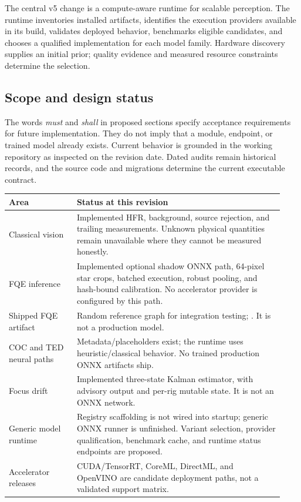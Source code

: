 \documentclass[11pt,a4paper]{article}
\newcommand{\code}[1]{\texttt{\detokenize{#1}}}
\begin{document}
The central v5 change is a compute-aware runtime for scalable perception.
The runtime inventories installed artifacts, identifies the execution providers
available in its build, validates deployed behavior, benchmarks eligible
candidates, and chooses a qualified implementation for each model family.
Hardware discovery supplies an initial prior; quality evidence and measured
resource constraints determine the selection.

\subsection{Scope and design status}
The words \emph{must} and \emph{shall} in proposed sections specify acceptance
requirements for future implementation. They do not imply that a module,
endpoint, or trained model already exists. Current behavior is grounded in the
working repository as inspected on the revision date. Dated audits remain
historical records, and the source code and migrations determine the current
executable contract.

\begin{longtable}{@{}L{0.23\linewidth}L{0.70\linewidth}@{}}
\toprule Area & Status at this revision\\\midrule\endhead
Classical vision & Implemented HFR, background, source rejection, and trailing
measurements. Unknown physical quantities remain unavailable where they cannot
be measured honestly.\\
FQE inference & Implemented optional shadow ONNX path, 64-pixel star crops,
batched execution, robust pooling, and hash-bound calibration. No accelerator
provider is configured by this path.\\
Shipped FQE artifact & Random reference graph for integration testing;
\code{runtime_eligible=false}. It is not a production model.\\
COC and TED neural paths & Metadata/placeholders exist; the runtime uses
heuristic/classical behavior. No trained production ONNX artifacts ship.\\
Focus drift & Implemented three-state Kalman estimator, with advisory output
and per-rig mutable state. It is not an ONNX network.\\
Generic model runtime & Registry scaffolding is not wired into startup;
generic ONNX runner is unfinished. Variant selection, provider qualification,
benchmark cache, and runtime status endpoints are proposed.\\
Accelerator releases & CUDA/TensorRT, CoreML, DirectML, and OpenVINO are
candidate deployment paths, not a validated support matrix.\\
\bottomrule
\end{longtable}
\end{document}
